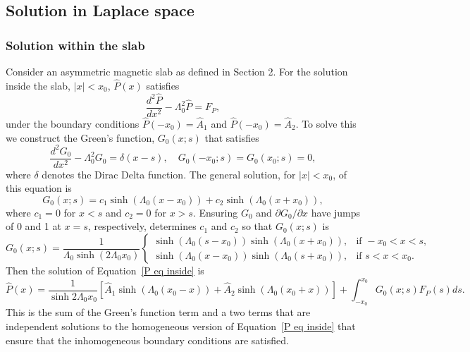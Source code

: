 \documentclass{aastex61}
\begin{document}
\subsection{Solution in Laplace space}

\subsubsection{Solution within the slab}
Consider an asymmetric magnetic slab as defined in Section 2. For the solution inside the slab, $|x| < x_0$, $\hat{P}(x)$ satisfies
\begin{equation}
\frac{d^2\hat{P}}{dx^2} - \Lambda_0^2 \hat{P} = F_P,
\label{P eq inside}
\end{equation}
under the boundary conditions $\hat{P}(-x_0) = \hat{A}_1$ and $\hat{P}(-x_0) = \hat{A}_2$. To solve this we construct the Green's function, $G_0(x;s)$ that satisfies
\begin{equation}
\frac{d^2G_0}{dx^2} - \Lambda_0^2 G_0 = \delta(x-s), \quad G_0(-x_0;s) = G_0(x_0;s) = 0,
\end{equation}
where $\delta$ denotes the Dirac Delta function. The general solution, for $|x| < x_0$, of this equation is
\begin{equation}
G_0(x;s) = c_1\sinh(\Lambda_0(x - x_0)) + c_2\sinh(\Lambda_0(x + x_0)),
\end{equation}
where $c_1 = 0$ for $x < s$ and $c_2 = 0$ for $x > s$. Ensuring $G_0$ and $\partial G_0 / \partial x$ have jumps of 0 and 1 at $x = s$, respectively, determines $c_1$ and $c_2$ so that $G_0(x;s)$ is
\begin{equation}
G_0(x;s) = \frac{1}{\Lambda_0\sinh(2\Lambda_0 x_0)}
\begin{cases}
\sinh(\Lambda_0(s - x_0))\sinh(\Lambda_0(x + x_0)), & \text{if } -x_0<x<s, \\
\sinh(\Lambda_0(x - x_0))\sinh(\Lambda_0(s + x_0)), & \text{if } s<x<x_0.
\end{cases}
\end{equation}
Then the solution of Equation~\eqref{P eq inside} is
\begin{equation}
\hat{P}(x) = \frac{1}{\sinh{2\Lambda_0x_0}} \left[ \hat{A}_1\sinh(\Lambda_0(x_0 - x)) + \hat{A}_2\sinh(\Lambda_0(x_0 + x)) \right] + \int_{-x_0}^{x_0} G_0(x;s) F_P(s) ds.
\label{P sol 0}
\end{equation}
This is the sum of the Green's function term and a two terms that are independent solutions to the homogeneous version of Equation~\eqref{P eq inside} that ensure that the inhomogeneous boundary conditions are satisfied.
\end{document}
